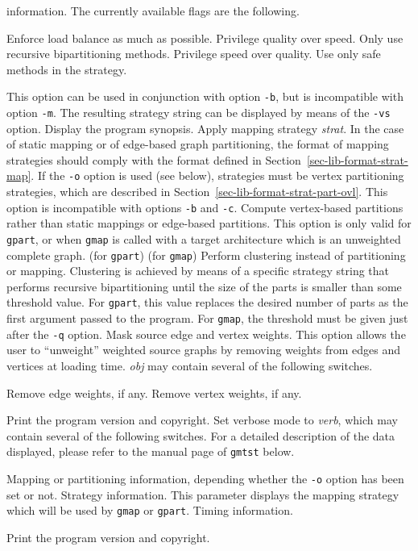 \begin{itemize}
\begin{itemize}
information. The currently available flags are the following.
\begin{itemize}
\iteme[\texttt{b}]
Enforce load balance as much as possible.
\iteme[\texttt{q}]
Privilege quality over speed.
\iteme[\texttt{r}]
Only use recursive bipartitioning methods.
\iteme[\texttt{s}]
Privilege speed over quality.
\iteme[\texttt{t}]
Use only safe methods in the strategy.
\end{itemize}
This option can be used in conjunction with option \texttt{-b}, but is
incompatible with option \texttt{-m}.
The resulting strategy string can be displayed by means
of the \texttt{-vs} option.
\iteme[\texttt{-h}]
Display the program synopsis.
Apply mapping strategy {\it strat}. In the case of static mapping or
of edge-based graph partitioning, the format of mapping strategies
should comply with the format defined in
Section~\ref{sec-lib-format-strat-map}. If the \texttt{-o} option is used (see
below), strategies must be vertex partitioning strategies, which are
described in Section~\ref{sec-lib-format-strat-part-ovl}.
This option is incompatible with options \texttt{-b} and
\texttt{-c}.
\iteme[\texttt{-o}]
Compute vertex-based partitions rather than static mappings or
edge-based partitions. This option is only valid for \texttt{gpart}, or
when \texttt{gmap} is called with a target architecture which is an
unweighted complete graph.
\iteme[\texttt{-q}] (for \texttt{gpart})
 (for \texttt{gmap})
Perform clustering instead of partitioning or mapping. Clustering is
achieved by means of a specific strategy string that performs
recursive bipartitioning until the size of the parts is smaller than
some threshold value. For \texttt{gpart}, this value replaces the desired
number of parts as the first argument passed to the program. For
\texttt{gmap}, the threshold must be given just after the \texttt{-q} option.
Mask source edge and vertex weights. This option allows the user to
``unweight'' weighted source graphs by removing weights from edges and
vertices at loading time. {\it obj\/} may contain several of the following
switches.
\begin{itemize}
\iteme[\texttt{e}]
Remove edge weights, if any.
\iteme[\texttt{v}]
Remove vertex weights, if any.
\end{itemize}
\iteme[\texttt{-V}]
Print the program version and copyright.
Set verbose mode to {\it verb}, which may contain several of the following
switches. For a detailed description of the data displayed, please
refer to the manual page of \texttt{gmtst} below.
\begin{itemize}
\iteme[\texttt{m}]
Mapping or partitioning information, depending whether the \texttt{-o}
option has been set or not.
\iteme[\texttt{s}]
Strategy information. This parameter displays the mapping
strategy which will be used by \texttt{gmap} or \texttt{gpart}.
\iteme[\texttt{t}]
Timing information.
\end{itemize}
\iteme[\texttt{-V}]
Print the program version and copyright.
\end{itemize}
\end{itemize}

